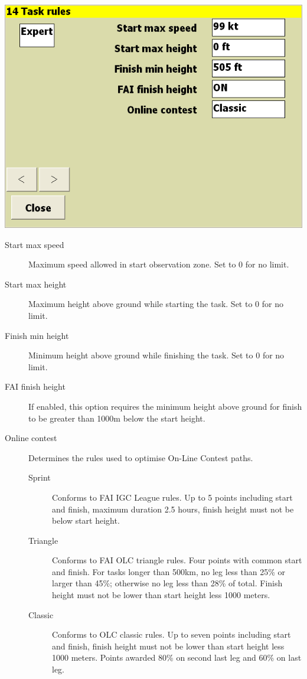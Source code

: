 \documentclass[a4paper,12pt]{refrep}
\begin{document}
\begin{center}
\includegraphics[angle=0,width=\linewidth,keepaspectratio='true']{figures/config-12.png}
\end{center}

\begin{description}
\item[Start max speed]  Maximum speed allowed in start observation zone.  Set to 0 for no limit.
\item[Start max height]  Maximum height above ground while starting the task.  Set to 0 for no limit.
\item[Finish min height]  Minimum height above ground while finishing the task.  Set to 0 for no limit. 
\item[FAI finish height]  If enabled, this option requires the minimum height above ground for finish to be greater than 1000m below the start height.
\item[Online contest] Determines the rules used to optimise On-Line Contest paths. 
\begin{description}
\item[Sprint]  Conforms to FAI IGC League rules.  Up to 5 points including start and finish, maximum duration 2.5 hours, finish height must not be below start height.
\item[Triangle]  Conforms to FAI OLC triangle rules.  Four points with common start and finish.  For tasks longer than 500km, no leg less than 25\% or larger than 45\%; otherwise no leg less than 28\% of total.  Finish height must not be lower than start height less 1000 meters.
\item[Classic]  Conforms to OLC classic rules.  Up to seven points including start and finish, finish height must not be lower than start height less 1000 meters.  Points awarded 80\% on second last leg and 60\% on last leg.
\end{description}
\end{description}
\end{document}
